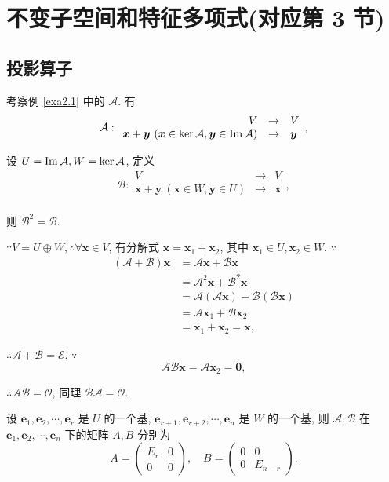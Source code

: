 \documentclass[color=black,device=normal,lang=cn,mode=geye]{elegantnote}
\begin{document}
\section{不变子空间和特征多项式(对应第 3 节)}
\subsection{投影算子}
考察例 \ref{exa2.1} 中的 $\mathcal{A}$. 有
\[\mathcal{A}:\begin{array}{rcl}
    V & \to & V \\
    \boldsymbol{x}+\boldsymbol{y}\ (\boldsymbol{x}\in\ker\mathcal{A},\boldsymbol{y}\in\im \mathcal{A}) & \to & \boldsymbol{y} \\
\end{array},\]

设 $U=\operatorname{Im} \mathcal{A},W=\ker\mathcal{A}$, 定义
\[\mathcal{B}:\begin{array}{rcl}
    V & \to & V \\
    \boldsymbol{x}+\boldsymbol{y}\ (\boldsymbol{x}\in W,\boldsymbol{y}\in U) & \to & \boldsymbol{x} \\
\end{array},\]

则 $\mathcal{B}^2=\mathcal{B}$.

$\because V=U\oplus W,\therefore\forall\boldsymbol{x}\in V$, 有分解式 $\boldsymbol{x}=\boldsymbol{x}_1+\boldsymbol{x}_2$, 其中 $\boldsymbol{x}_1\in U,\boldsymbol{x}_2\in W$. $\because$
\begin{align*}
    (\mathcal{A}+\mathcal{B})\boldsymbol{x} & =\mathcal{A}\boldsymbol{x}+\mathcal{B}\boldsymbol{x} \\
    & =\mathcal{A}^2\boldsymbol{x}+\mathcal{B}^2\boldsymbol{x} \\
    & =\mathcal{A}(\mathcal{A}\boldsymbol{x})+\mathcal{B}(\mathcal{B}\boldsymbol{x}) \\
    & =\mathcal{A}\boldsymbol{x}_1+\mathcal{B}\boldsymbol{x}_2 \\
    & =\boldsymbol{x}_1+\boldsymbol{x}_2=\boldsymbol{x},
\end{align*}

$\therefore\mathcal{A}+\mathcal{B}=\mathcal{E}$. $\because$
\[\mathcal{A}\mathcal{B}\boldsymbol{x}=\mathcal{A}\boldsymbol{x}_2=\boldsymbol{0},\]

$\therefore\mathcal{A}\mathcal{B}=\mathcal{O}$, 同理 $\mathcal{B}\mathcal{A}=\mathcal{O}$.

设 $\boldsymbol{e}_1,\boldsymbol{e}_2,\cdots,\boldsymbol{e}_r$ 是 $U$ 的一个基, $\boldsymbol{e}_{r+1},\boldsymbol{e}_{r+2},\cdots,\boldsymbol{e}_n$ 是 $W$ 的一个基, 则 $\mathcal{A},\mathcal{B}$ 在 $\boldsymbol{e}_1,\boldsymbol{e}_2,\cdots,\boldsymbol{e}_n$ 下的矩阵 $A,B$ 分别为
\[A=\begin{pmatrix}
    E_r & 0 \\
    0 & 0
\end{pmatrix},\quad B=\begin{pmatrix}
    0 & 0 \\
    0 & E_{n-r}
\end{pmatrix}.\]
\end{document}

